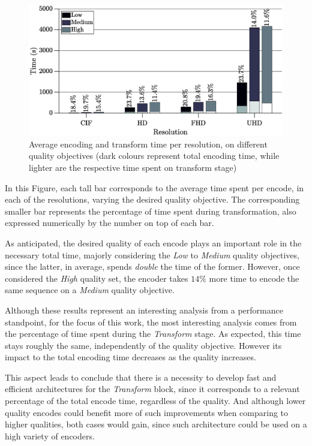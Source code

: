 \begin{figure}[!htpb]
    \centering
    \includegraphics[width=\textwidth]{Sections/3Transforms/Images/TimingAnalysisAvg.eps}
    \caption[Average encoding and transform time per resolution, on different quality objectives]{Average encoding and transform time per resolution, on different quality objectives (dark colours represent total encoding time, while lighter are the respective time spent on transform stage)}
    \label{fig:timeavg}
\end{figure}

In this Figure, each tall bar corresponds to the average time spent per encode, in each of the resolutions, varying the desired quality objective. The corresponding smaller bar represents the percentage of time spent during transformation, also expressed numerically by the number on top of each bar.

As anticipated, the desired quality of each encode plays an important role in the necessary total time, majorly considering the \emph{Low} to \emph{Medium} quality objectives, since the latter, in average, spends \emph{double} the time of the former. However, once considered the \emph{High} quality set, the encoder takes $14 \%$ more time to encode the same sequence on a \emph{Medium} quality objective.

Although these results represent an interesting analysis from a performance standpoint, for the focus of this work, the most interesting analysis comes from the percentage of time spent during the \emph{Transform} stage. As expected, this time stays roughly the same, independently of the quality objective. However its impact to the total encoding time decreases as the quality increases. 

This aspect leads to conclude that there is a necessity to develop fast and efficient architectures for the \emph{Transform} block, since it corresponds to a relevant percentage of the total encode time, regardless of the quality. And although lower quality encodes could benefit more of such improvements when comparing to higher qualities, both cases would gain, since such architecture could be used on a high variety of encoders.

